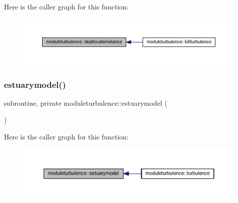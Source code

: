 Here is the caller graph for this function\+:\nopagebreak
\begin{figure}[H]
\begin{center}
\leavevmode
\includegraphics[width=350pt]{namespacemoduleturbulence_aad40d3e2593854d66c21ebbd92791ba0_icgraph}
\end{center}
\end{figure}
\mbox{\label{namespacemoduleturbulence_abcd63973fdc2c7e7d3ad23e011bee2d5}} 
\subsubsection{\texorpdfstring{estuarymodel()}{estuarymodel()}}
{\footnotesize\ttfamily subroutine, private moduleturbulence\+::estuarymodel (\begin{DoxyParamCaption}{ }\end{DoxyParamCaption})\hspace{0.3cm}{\ttfamily [private]}}

Here is the caller graph for this function\+:\nopagebreak
\begin{figure}[H]
\begin{center}
\leavevmode
\includegraphics[width=350pt]{namespacemoduleturbulence_abcd63973fdc2c7e7d3ad23e011bee2d5_icgraph}
\end{center}
\end{figure}
\mbox{\label{namespacemoduleturbulence_a78bc503a0ceb792c161200d1e1e51bf0}} 
